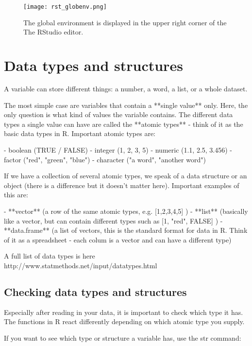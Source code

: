 \documentclass[a4paper,twoside]{tufte-book}\usepackage[]{graphicx}\usepackage[]{color}
\begin{document}
\begin{Anhang}
\begin{figure}[]
\begin{center}
\texttt{[image: rst\_globenv.png]}
\caption{The global environment is displayed in the upper right corner of the The RStudio editor.}
\label{fig: Rstudio}
\end{center}
\end{figure}

\section{Data types and structures}

A variable can store different things: a number, a word, a list, or a whole dataset. 

The most simple case are variables that contain a **single value** only. Here, the only question is what kind of values the variable contains. The different data types a single value can have are called the **atomic types** - think of it as the basic data types in R. Important atomic types are: 

- boolean (TRUE / FALSE)
- integer (1, 2, 3, 5)
- numeric (1.1, 2.5, 3.456)
- factor ("red", "green", "blue")
- character ("a word", "another word")

If we have a collection of several atomic types, we speak of a data structure or an object (there is a difference but it doesn't matter here). Important examples of this are: 

- **vector** (a row of the same atomic types, e.g. [1,2,3,4,5] )
- **list** (basically like a vector, but can contain different types such as [1, "red", FALSE] )
- **data.frame** (a list of vectors, this is the standard format for data in R. Think of it as a spreadsheet - each colum is a vector and can have a different type)

A full list of data types is here http://www.statmethods.net/input/datatypes.html 
 
\subsection{Checking data types and structures}

Especially after reading in your data, it is important to check which type it has. The functions in R react differently depending on which atomic type you supply. 

If you want to see which type or structure a variable has, use the str command:


\end{Anhang}
\end{document}
